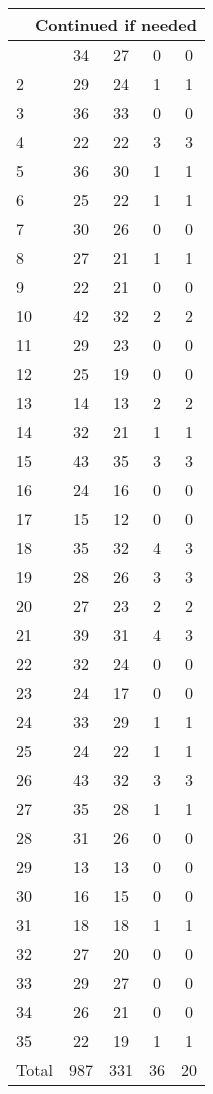 \begin{center}
\begin{longtable}{l|c|c|c|c}
\hline \multicolumn{5}{|r|}{{Continued if needed}} \\ \hline
\endfoot 
1 & 34 & 27 & 0 & 0\\ \hline
2 & 29 & 24 & 1 & 1\\ \hline
3 & 36 & 33 & 0 & 0\\ \hline
4 & 22 & 22 & 3 & 3\\ \hline
5 & 36 & 30 & 1 & 1\\ \hline
6 & 25 & 22 & 1 & 1\\ \hline
7 & 30 & 26 & 0 & 0\\ \hline
8 & 27 & 21 & 1 & 1\\ \hline
9 & 22 & 21 & 0 & 0\\ \hline
10 & 42 & 32 & 2 & 2\\ \hline
11 & 29 & 23 & 0 & 0\\ \hline
12 & 25 & 19 & 0 & 0\\ \hline
13 & 14 & 13 & 2 & 2\\ \hline
14 & 32 & 21 & 1 & 1\\ \hline
15 & 43 & 35 & 3 & 3\\ \hline
16 & 24 & 16 & 0 & 0\\ \hline
17 & 15 & 12 & 0 & 0\\ \hline
18 & 35 & 32 & 4 & 3\\ \hline
19 & 28 & 26 & 3 & 3\\ \hline
20 & 27 & 23 & 2 & 2\\ \hline
21 & 39 & 31 & 4 & 3\\ \hline
22 & 32 & 24 & 0 & 0\\ \hline
23 & 24 & 17 & 0 & 0\\ \hline
24 & 33 & 29 & 1 & 1\\ \hline
25 & 24 & 22 & 1 & 1\\ \hline
26 & 43 & 32 & 3 & 3\\ \hline
27 & 35 & 28 & 1 & 1\\ \hline
28 & 31 & 26 & 0 & 0\\ \hline
29 & 13 & 13 & 0 & 0\\ \hline
30 & 16 & 15 & 0 & 0\\ \hline
31 & 18 & 18 & 1 & 1\\ \hline
32 & 27 & 20 & 0 & 0\\ \hline
33 & 29 & 27 & 0 & 0\\ \hline
34 & 26 & 21 & 0 & 0\\ \hline
35 & 22 & 19 & 1 & 1\\ \hline
Total & 987 & 331 & 36 & 20
\end{longtable}
\end{center}



